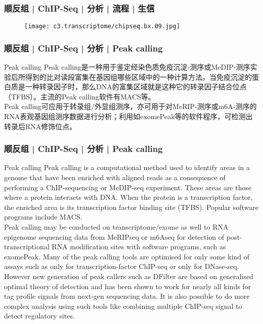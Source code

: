 \begin{frame}
  \frametitle{顺反组 | ChIP-Seq | 分析 | 流程 | 生信}
  \begin{figure}
    \centering
    \texttt{[image: c3.transcriptome/chipseq.bx.09.jpg]}
  \end{figure}
\end{frame}

\begin{frame}
  \frametitle{顺反组 | ChIP-Seq | 分析 | Peak calling}
  \begin{block}{Peak calling}
    Peak calling是一种用于鉴定经染色质免疫沉淀-测序或MeDIP-测序实验后所得到的比对读段富集在基因组哪些区域中的一种计算方法。当免疫沉淀的蛋白质是一种转录因子时，那么DNA的富集区域就是这种它的转录因子结合位点（TFBS）。主流的Peak calling软件有MACS等。\\
    \vspace{1em}
    Peak calling可应用于转录组/外显组测序，亦可用于对MeRIP-测序或m6A-测序的RNA表观基因组测序数据进行分析；利用如exomePeak等的软件程序，可检测出转录后RNA修饰位点。
  \end{block}
\end{frame}

\begin{frame}
  \frametitle{顺反组 | ChIP-Seq | 分析 | Peak calling}
  {\footnotesize
  \begin{block}{Peak calling}
    Peak calling is a computational method used to identify areas in a genome that have been enriched with aligned reads as a consequence of performing a ChIP-sequencing or MeDIP-seq experiment. These areas are those where a protein interacts with DNA. When the protein is a transcription factor, the enriched area is its transcription factor binding site (TFBS). Popular software programs include MACS.\\
    \vspace{1em}
    Peak calling may be conducted on transcriptome/exome as well to RNA epigenome sequencing data from MeRIPseq or m6Aseq for detection of post-transcriptional RNA modification sites with software programs, such as exomePeak. Many of the peak calling tools are optimised for only some kind of assays such as only for transcription-factor ChIP-seq or only for DNase-seq. However new generation of peak callers such as DFilter are based on generalised optimal theory of detection and has been shown to work for nearly all kinds for tag profile signals from next-gen sequencing data. It is also possible to do more complex analysis using such tools like combining multiple ChIP-seq signal to detect regulatory sites.
  \end{block}
  }
\end{frame}

